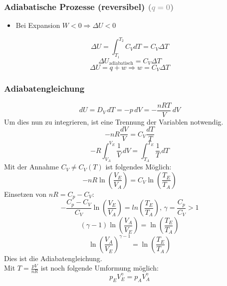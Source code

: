 \documentclass[a4paper, fleqn]{article}
\begin{document}
\subsubsection{Adiabatische Prozesse (reversibel) \textcolor{gray}{($q=0$)}}
\begin{itemize}
    \item[] Bei Expansion $W < 0 \Rightarrow \Delta U < 0$
\end{itemize}
\begin{equation*}
    \Delta U = \int_{T_1}^{T_2} C_V dT = C_V \Delta T
\end{equation*}
\begin{equation*}
    \Delta U_{\mathrm{adiabatisch}} = C_V \Delta T
\end{equation*}
\begin{equation*}
    \Delta U = q + w \Rightarrow w = C_V \Delta T
\end{equation*}

\subsubsection{Adiabatengleichung}
\begin{equation*}
    dU = D_V \,dT = -p\,dV = - \frac{nRT}{V} \, dV
\end{equation*}
Um dies nun zu integrieren, ist eine Trennung der Variablen notwendig.
\begin{equation*}
    -nR \frac{dV}{V} = C_V \frac{dT}{T}
\end{equation*}
\begin{equation*}
    -R \int_{V_A}^{V_E} \frac{1}{V}\,dV = \int_{T_A}^{T_E} \frac{1}{T} \, dT
\end{equation*}
Mit der Annahme $C_V \neq C_V (T)$ ist folgendes Möglich:
\begin{equation*}
    -nR \ln\left(\frac{V_E}{V_A}\right) = C_V \ln\left(\frac{T_E}{T_A}\right)
\end{equation*}
Einsetzen von $nR = C_p - C_V$:
\begin{equation*}
    - \frac{C_p - C_V}{C_V} \ln\left(\frac{V_E}{V_A}\right) = ln\left(\frac{T_E}{T_A}\right), \, \gamma = \frac{C_p}{C_V} > 1
\end{equation*}
\begin{equation*}
    (\gamma - 1)\ln\left(\frac{V_A}{V_E}\right) = \ln\left(\frac{T_E}{T_A}\right)
\end{equation*}
\begin{equation*}
    \ln\left(\frac{V_A}{V_E}\right)^{\gamma-1} = \ln\left(\frac{T_E}{T_A}\right)
\end{equation*}
Dies ist die Adiabatengleichung.\\
Mit $T = \frac{pV}{nR}$ ist noch folgende Umformung möglich:
\begin{equation*}
    p_EV_E^\gamma = p_AV_A^\gamma
\end{equation*}
\end{document}
